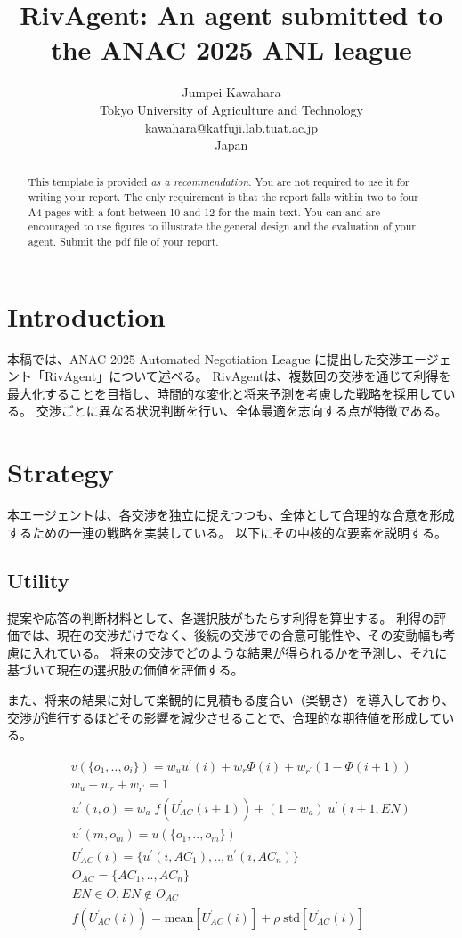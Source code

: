 \documentclass{article}
\title{RivAgent: An agent submitted to the ANAC 2025 ANL league}
\author{Jumpei Kawahara\\Tokyo University of Agriculture and Technology\\kawahara@katfuji.lab.tuat.ac.jp\\Japan}
\begin{document}
\maketitle
\begin{abstract}
	This template is provided \emph{as a recommendation}. You are not required
	to use it for writing your report. The only requirement is that the report
	falls within two to four A4 pages with a font between 10 and 12 for the main
	text. You can and are encouraged to use figures to illustrate the general
	design and the evaluation of your agent. Submit the pdf file of your report.
\end{abstract}

\section{Introduction}
本稿では、ANAC 2025 Automated Negotiation League に提出した交渉エージェント「RivAgent」について述べる。
RivAgentは、複数回の交渉を通じて利得を最大化することを目指し、時間的な変化と将来予測を考慮した戦略を採用している。
交渉ごとに異なる状況判断を行い、全体最適を志向する点が特徴である。

\section{Strategy}
本エージェントは、各交渉を独立に捉えつつも、全体として合理的な合意を形成するための一連の戦略を実装している。
以下にその中核的な要素を説明する。

\subsection{Utility}
提案や応答の判断材料として、各選択肢がもたらす利得を算出する。
利得の評価では、現在の交渉だけでなく、後続の交渉での合意可能性や、その変動幅も考慮に入れている。
将来の交渉でどのような結果が得られるかを予測し、それに基づいて現在の選択肢の価値を評価する。

また、将来の結果に対して楽観的に見積もる度合い（楽観さ）を導入しており、交渉が進行するほどその影響を減少させることで、合理的な期待値を形成している。

\begin{eqnarray}
	&&v(\{o_1,..,o_i\}) = w_u u^{\prime}(i) + w_{r}\Phi(i) + w_{r^{\prime}}(1-\Phi(i+1))\\
	&&w_u + w_r + w_{r^{\prime}} = 1
\end{eqnarray}
\begin{eqnarray}
	&&u^{\prime}(i,o) = w_a\;f(U_{AC}^{\prime}(i+1)) + (1-w_a)\;u^{\prime}(i+1,EN)\\
	&&u^{\prime}(m,o_m) = u(\{o_1,..,o_m\})\\
	&&U_{AC}^{\prime}(i) = \{u^{\prime}(i,AC_1),..,u^{\prime}(i,AC_n)\}\\
	&&O_{AC} = \{AC_1,..,AC_n\}\\
	&&EN\in O, EN\notin O_{AC}\\
	&&f(U_{AC}^{\prime}(i)) = \text{mean}[U_{AC}^{\prime}(i)] + \rho\;\text{std}[U_{AC}^{\prime}(i)]
\end{eqnarray}
\end{document}
